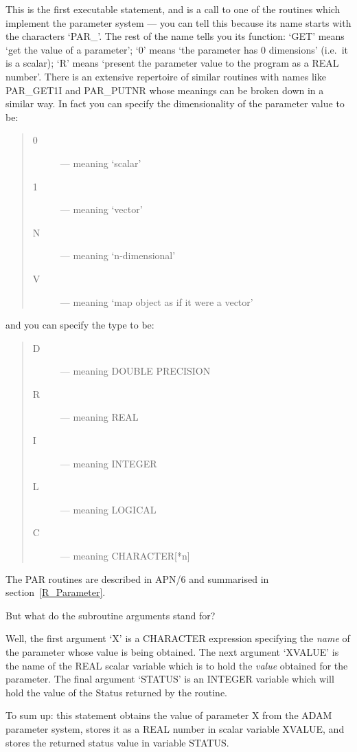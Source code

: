 This is the first executable statement, and is a call to one of the routines
which implement the parameter system --- you can tell this because its name
starts with the characters `PAR\_'.
The rest of the name tells you its function: `GET' means `get the value of a
parameter'; `0' means `the parameter has 0 dimensions' (i.e.\ it is a scalar);
`R' means `present the parameter value to the program as a REAL number'.
There is an extensive repertoire of similar routines with names like
PAR\_GET1I and PAR\_PUTNR whose meanings can be broken down in a similar way.
In fact you can specify the dimensionality of the parameter value to be:
\begin{quote}
\begin{description}
\item [0] --- meaning `scalar'
\item [1] --- meaning `vector'
\item [N] --- meaning `n-dimensional'
\item [V] --- meaning `map object as if it were a vector'
\end{description}
\end{quote}
and you can specify the type to be:
\begin{quote}
\begin{description}
\item [D] --- meaning DOUBLE PRECISION
\item [R] --- meaning REAL
\item [I] --- meaning INTEGER
\item [L] --- meaning LOGICAL
\item [C] --- meaning CHARACTER[*n]
\end{description}
\end{quote}
The PAR routines are described in APN/6 and summarised in
section~\ref{R_Parameter}.

But what do the subroutine arguments stand for?

Well, the first argument `X' is a CHARACTER expression specifying the
{\em name} of the parameter whose value is being obtained.
The next argument `XVALUE' is the name of the REAL scalar variable which is to
hold the {\em value} obtained for the parameter.
The final argument `STATUS' is an INTEGER variable which will hold the value of
the Status returned by the routine.

To sum up: this statement obtains the value of parameter X from the ADAM
parameter system, stores it as a REAL number in scalar variable XVALUE, and
stores the returned status value in variable STATUS.

